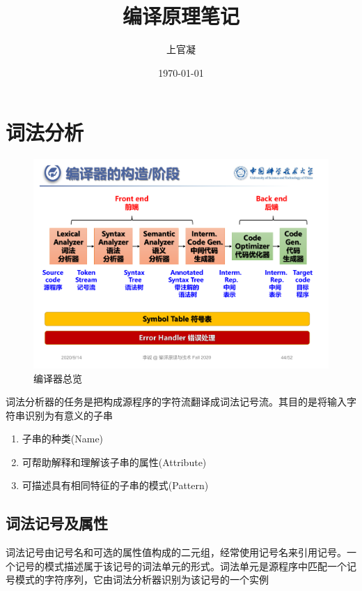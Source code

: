 \documentclass[]{report}
\title{{\huge {编译原理笔记}}}
\author{上官凝}
\date{\today}
\begin{document}
\theoremstyle{definition} \newtheorem{theorem}{Thm}[section] %
\theoremstyle{definition} \newtheorem{definition}{Def}[section] %
\theoremstyle{plain} \newtheorem{lemma}{lemma}[section] %

	\maketitle
	\newpage

	\tableofcontents
	\newpage

	\chapter{词法分析}
	\begin{figure}
		\centering
		\begin{minipage}{40em}
			\centering
			\includegraphics[scale = 0.3]{images/lecture_intro.pdf}
			\caption{编译器总览}
		\end{minipage}
	\end{figure}
	词法分析器的任务是把构成源程序的字符流翻译成词法记号流。其目的是将输入字符串识别为有意义的子串
	\begin{enumerate}
		\item 子串的种类(Name)
		\item 可帮助解释和理解该子串的属性(Attribute)
		\item 可描述具有相同特征的子串的模式(Pattern)
	\end{enumerate}
	\section{词法记号及属性}
		词法记号由记号名和可选的属性值构成的二元组，经常使用记号名来引用记号。一个记号的模式描述属于该记号的词法单元的形式。词法单元是源程序中匹配一个记号模式的字符序列，它由词法分析器识别为该记号的一个实例
\end{document}
